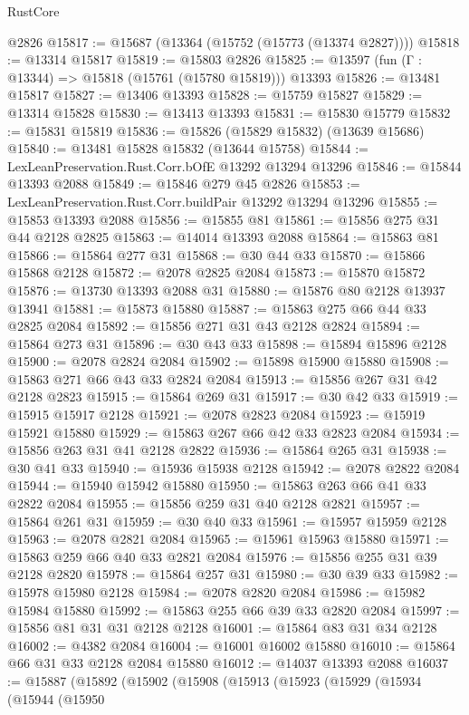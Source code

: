 \begin{lexlean}{RustCore}
\begin{coremodule}
    @2826
@15817 := @15687 (@13364 (@15752 (@15773 (@13374 @2827))))
@15818 := @13314 @15817
@15819 := @15803 @2826
@15825 := @13597 (fun (Γ : @13344) => @15818 (@15761 (@15780 @15819))) @13393
@15826 := @13481 @15817
@15827 := @13406 @13393
@15828 := @15759 @15827
@15829 := @13314 @15828
@15830 := @13413 @13393
@15831 := @15830 @15779
@15832 := @15831 @15819
@15836 := @15826 (@15829 @15832) (@13639 @15686)
@15840 := @13481 @15828 @15832 (@13644 @15758)
@15844 := LexLeanPreservation.Rust.Corr.bOfE @13292 @13294 @13296
@15846 := @15844 @13393 @2088
@15849 := @15846 @279 @45 @2826
@15853 := LexLeanPreservation.Rust.Corr.buildPair @13292 @13294 @13296
@15855 := @15853 @13393 @2088
@15856 := @15855 @81
@15861 := @15856 @275 @31 @44 @2128 @2825
@15863 := @14014 @13393 @2088
@15864 := @15863 @81
@15866 := @15864 @277 @31
@15868 := @30 @44 @33
@15870 := @15866 @15868 @2128
@15872 := @2078 @2825 @2084
@15873 := @15870 @15872
@15876 := @13730 @13393 @2088 @31
@15880 := @15876 @80 @2128 @13937 @13941
@15881 := @15873 @15880
@15887 := @15863 @275 @66 @44 @33 @2825 @2084
@15892 := @15856 @271 @31 @43 @2128 @2824
@15894 := @15864 @273 @31
@15896 := @30 @43 @33
@15898 := @15894 @15896 @2128
@15900 := @2078 @2824 @2084
@15902 := @15898 @15900 @15880
@15908 := @15863 @271 @66 @43 @33 @2824 @2084
@15913 := @15856 @267 @31 @42 @2128 @2823
@15915 := @15864 @269 @31
@15917 := @30 @42 @33
@15919 := @15915 @15917 @2128
@15921 := @2078 @2823 @2084
@15923 := @15919 @15921 @15880
@15929 := @15863 @267 @66 @42 @33 @2823 @2084
@15934 := @15856 @263 @31 @41 @2128 @2822
@15936 := @15864 @265 @31
@15938 := @30 @41 @33
@15940 := @15936 @15938 @2128
@15942 := @2078 @2822 @2084
@15944 := @15940 @15942 @15880
@15950 := @15863 @263 @66 @41 @33 @2822 @2084
@15955 := @15856 @259 @31 @40 @2128 @2821
@15957 := @15864 @261 @31
@15959 := @30 @40 @33
@15961 := @15957 @15959 @2128
@15963 := @2078 @2821 @2084
@15965 := @15961 @15963 @15880
@15971 := @15863 @259 @66 @40 @33 @2821 @2084
@15976 := @15856 @255 @31 @39 @2128 @2820
@15978 := @15864 @257 @31
@15980 := @30 @39 @33
@15982 := @15978 @15980 @2128
@15984 := @2078 @2820 @2084
@15986 := @15982 @15984 @15880
@15992 := @15863 @255 @66 @39 @33 @2820 @2084
@15997 := @15856 @81 @31 @31 @2128 @2128
@16001 := @15864 @83 @31 @34 @2128
@16002 := @4382 @2084
@16004 := @16001 @16002 @15880
@16010 := @15864 @66 @31 @33 @2128 @2084 @15880
@16012 := @14037 @13393 @2088
@16037 := @15887
    (@15892
      (@15902
        (@15908
          (@15913
            (@15923
              (@15929
                (@15934
                  (@15944
                    (@15950

\end{coremodule}
\end{lexlean}
